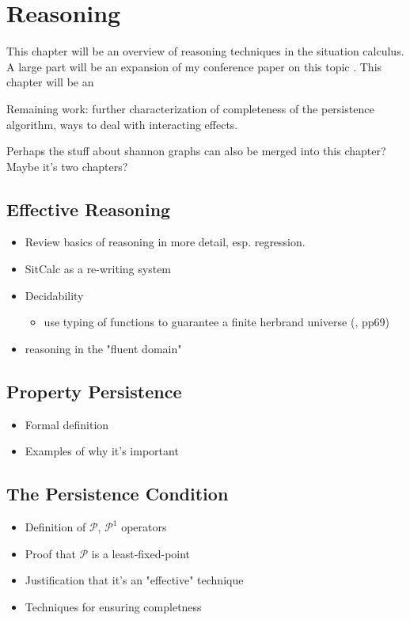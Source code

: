 \chapter{Reasoning}\label{ch:persistence}

This chapter will be an overview of reasoning techniques in the situation
calculus.  A large part will be an expansion of my conference paper on this topic \cite{kelly07sc_persistence}.
This chapter will be an 

Remaining work: further characterization of completeness of the persistence algorithm, ways to deal with interacting effects.

Perhaps the stuff about shannon graphs can also be merged into this chapter?
Maybe it's two chapters?

\section{Effective Reasoning}

\begin{itemize}
\item Review basics of reasoning in more detail, esp. regression.
\item SitCalc as a re-writing system
\item Decidability
  \begin{itemize}
  \item use typing of functions to guarantee a finite herbrand universe (\cite{levesque04krr_book}, pp69)
  \end{itemize}
\item reasoning in the "fluent domain"
\end{itemize}

\section{Property Persistence}

\begin{itemize}
\item Formal definition
\item Examples of why it's important
\end{itemize}

\section{The Persistence Condition}

\begin{itemize}
\item Definition of $\mathcal{P}$, $\mathcal{P}^{1}$ operators
\item Proof that $\mathcal{P}$ is a least-fixed-point
\item Justification that it's an "effective" technique
\item Techniques for ensuring completness
\end{itemize}

